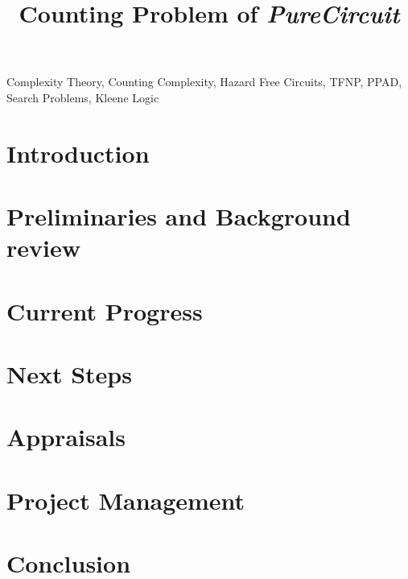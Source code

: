 \documentclass[onecolumn]{IEEEtran}
\begin{document}
\title{Counting Problem of \textit{PureCircuit}}

\author{
}

\maketitle

\begin{abstract}

\end{abstract}

\begin{IEEEkeywords} %
    Complexity Theory, Counting Complexity, Hazard Free Circuits, TFNP, PPAD, Search Problems, Kleene Logic
\end{IEEEkeywords}

\section{Introduction}


\section{Preliminaries and Background review}


\section{Current Progress}


\section{Next Steps}


\section{Appraisals}


\section{Project Management} 


\section{Conclusion} 

    



% 
\end{document}
